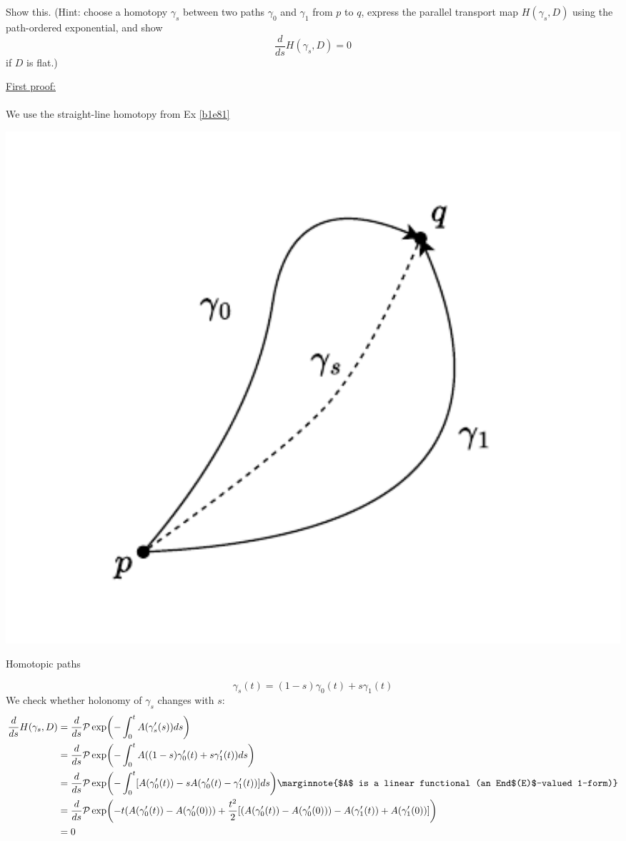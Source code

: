 \documentclass[10pt]{article}
\begin{document}
\begin{example}\label{b2e96}
	Show this. (Hint: choose a homotopy $\gamma_s$ between two paths $\gamma_0$ and $\gamma_1$ from $p$ to $q$, express the parallel transport map $H(\gamma_s,D)$ using the path-ordered exponential, and show
	$$
	\frac{d}{ds}H(\gamma_s,D)=0
	$$
	if $D$ is flat.)
\end{example}
\sol \underline{First proof:}\\\\
We use the straight-line homotopy from Ex \ref{b1e81}
\begin{marginfigure}
	\begin{center}
		\vspace*{35px}\includegraphics[width=1.4\textwidth]{figs/loop.pdf}
	\end{center}
	\caption{Homotopic paths}
\end{marginfigure}
$$
\gamma_s(t) = (1-s)\gamma_0(t)+s\gamma_1(t)
$$
We check whether holonomy of $\gamma_s$ changes with $s$:
$$
\begin{aligned}
	\frac{d}{ds}H(\gamma_s,D) &= \frac{d}{ds}\mc{P}\exp\p*{-\int_{0}^{t}A(\gamma_s^\prime(s))ds}\\
	&= \frac{d}{ds}\mc{P}\exp\p*{-\int_{0}^{t}A((1-s)\gamma_0^\prime(t)+s\gamma_1^\prime(t))ds}\\
	&= \frac{d}{ds}\mc{P}\exp\p*{-\int_{0}^{t}\sparen{A(\gamma_0^\prime(t))-sA(\gamma_0^\prime(t)-\gamma_1^\prime(t))}ds}\marginnote{$A$ is a linear functional (an End$(E)$-valued 1-form)}\\
	&= \frac{d}{ds}\mc{P}\exp\p*{-t\p{A(\gamma_0^\prime(t))-A(\gamma_0^\prime(0))}+\frac{t^2}{2}\sparen{\p{A(\gamma_0^\prime(t))-A(\gamma_0^\prime(0))}-A(\gamma_1^\prime(t))+A(\gamma_1^\prime(0))}}\\
	&=0
\end{aligned}
$$
\end{document}

